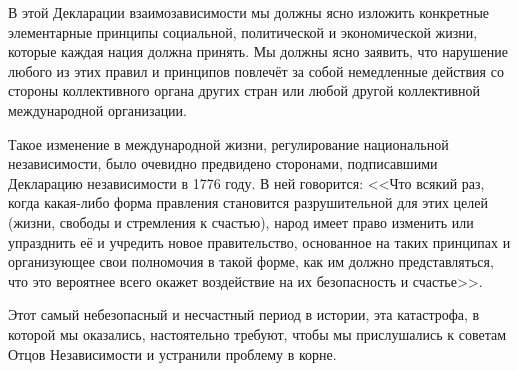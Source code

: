 В этой Декларации взаимозависимости мы должны ясно изложить конкретные элементарные принципы социальной, политической и экономической жизни, которые каждая нация должна принять. Мы должны ясно заявить, что нарушение любого из этих правил и принципов повлечёт за собой немедленные действия со стороны коллективного органа других стран или любой другой коллективной международной организации.

Такое изменение в международной жизни, регулирование национальной независимости, было очевидно предвидено сторонами, подписавшими Декларацию независимости в 1776 году. В ней говорится: <<Что всякий раз, когда какая-либо форма правления становится разрушительной для этих целей (жизни, свободы и стремления к счастью), народ имеет право изменить или упразднить её и учредить новое правительство, основанное на таких принципах и организующее свои полномочия в такой форме, как им должно представляться, что это вероятнее всего окажет воздействие на их безопасность и счастье>>.

Этот самый небезопасный и несчастный период в истории, эта катастрофа, в которой мы оказались, настоятельно требуют, чтобы мы прислушались к советам Отцов Независимости и устранили проблему в корне.
